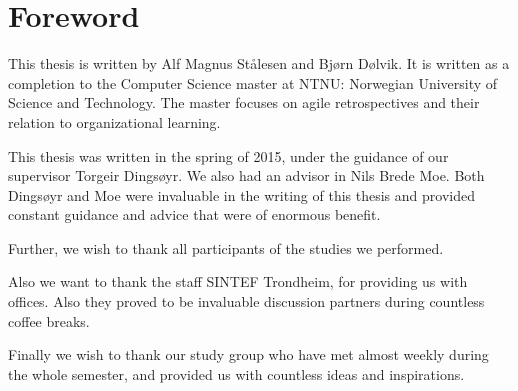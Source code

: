 \chapter*{Foreword}

This thesis is written by Alf Magnus Stålesen and Bjørn Dølvik. It is written as a completion to the Computer Science master at NTNU: Norwegian University of Science and Technology. The master focuses on agile retrospectives and their relation to organizational learning. 

This thesis was written in the spring of 2015, under the guidance of our supervisor Torgeir Dingsøyr. We also had an advisor in Nils Brede Moe. Both Dingsøyr and Moe were invaluable in the writing of this thesis and provided constant guidance and advice that were of enormous benefit. 

Further, we wish to thank all participants of the studies we performed. 

Also we want to thank the staff SINTEF Trondheim, for providing us with offices. Also they proved to be invaluable discussion partners during countless coffee breaks.

Finally we wish to thank our study group who have met almost weekly during the whole semester, and provided us with countless ideas and inspirations.


